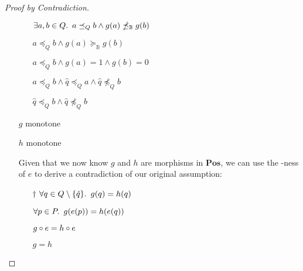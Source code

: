 \begin{lemma}
\begin{proof}[Proof by Contradiction]
\begin{itemize}
\begin{itemize}
          \item[\imps]
            $\exists a, b\in Q\ldotp~a\preceq_Qb\wedge g(a)\npreceq_{\mathbb{B}}g(b)$

          \item[\imps]
            $a\preceq_Qb\wedge g(a)\succeq_{\mathbb{B}}g(b)$

          \item[\imps]
            $a\preceq_Qb\wedge g(a) = 1\wedge g(b) = 0$

          \item[\imps]
            $a\preceq_Qb\wedge \hat{q}\preceq_Qa\wedge \hat{q}\npreceq_Qb$
          \item[\imps]
            $\hat{q}\preceq_Qb\wedge \hat{q}\npreceq_Qb$
        \end{itemize}

      \item[\contras] $g$ monotone
        \marginnote{\Contra-$\star$}

      \item[\phs] $h$ monotone

      \addtolength{\itemsep}{.5\baselineskip}
      \item[\phs] Given that we now know $g$ and $h$ are morphisms in $\mathbf{Pos}$, we can use the \Epic-ness of $e$ to derive a contradiction of our original assumption:

      \item[\phantom{\imps}]
        \begin{itemize}
          \item[$\dagger$]
            $\forall q\in Q\setminus\{\hat{q}\}\ldotp~g(q) = h(q)$

          \item[\imps]
            $\forall p\in P\ldotp~g(e(p)) = h(e(q))$


          \item[\iffs]
            $g\circ e = h\circ e$
            \marginnote{\Def-$=$}

          \item[\imps]
            $g = h$
        \end{itemize}
      \addtolength{\itemsep}{-.5\baselineskip}


\end{itemize}
\end{proof}
\end{lemma}
